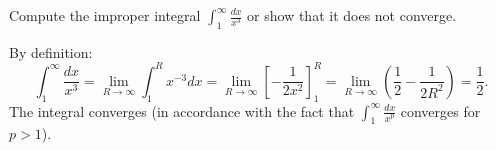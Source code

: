 
\begin{question}
Compute the improper integral $\displaystyle\int_1^\infty\frac{dx}{x^3}$ or show that it does not converge.
\end{question}

\begin{solution}
By definition:
\[ \int_1^\infty\frac{dx}{x^3}=\lim_{R\to\infty}\int_1^R x^{-3}dx=\lim_{R\to\infty}\left[-\frac{1}{2x^2}\right]_1^R=\lim_{R\to\infty}\left(\frac12-\frac{1}{2R^2}\right)=\boxed{\frac12}. \]
The integral converges (in accordance with the fact that $\int_1^\infty\frac{dx}{x^p}$ converges for $p>1$).
\end{solution}

